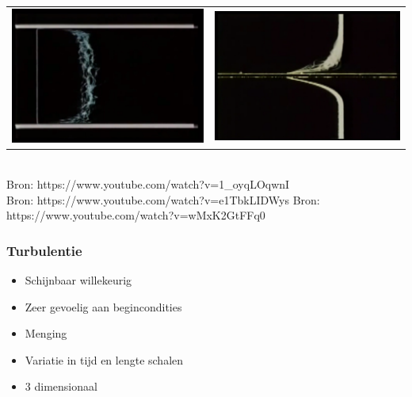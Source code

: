 \documentclass[t]{beamer}
\begin{document}
\begin{frame}
\begin{tabular}{cc}
{				\includegraphics[height=0.3\textheight]{../fig/uitwendige_stroming/Turbulent_velocity_profile.png}
			}
			&
			\href{run:fig/uitwendige_stroming/Turbulent_laminar_velocity_profile.mp4}{
				\includegraphics[height=0.3\textheight]{../fig/uitwendige_stroming/Turbulent_laminar_velocity_profile.png}
			}
		\end{tabular}\\
		
		\footnotesize{Bron: https://www.youtube.com/watch?v=1\_oyqLOqwnI}\\
		\footnotesize{Bron: https://www.youtube.com/watch?v=e1TbkLIDWys}
		\footnotesize{Bron: https://www.youtube.com/watch?v=wMxK2GtFFq0}
  	\end{frame}
  	\begin{frame}
		\frametitle{Turbulentie}
		\vspace{1cm}
		\begin{itemize}
			\pause
			\item Schijnbaar willekeurig
			\pause
			\item Zeer gevoelig aan begincondities
			\pause
			\item Menging
			\pause
			\item Variatie in tijd en lengte schalen
			\pause
			\item 3 dimensionaal
		\end{itemize}
  	\end{frame}
\end{document}
